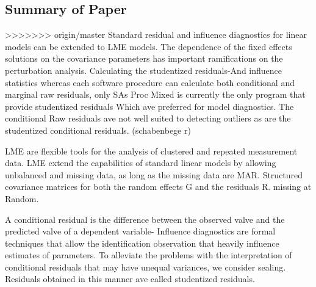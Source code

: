 \documentclass[12pt, a4paper]{article}
\begin{document}
\subsection{Summary of Paper}
>>>>>>> origin/master
Standard residual and influence diagnostics for linear models can be extended to LME models.
The dependence of the fixed effects solutions on the covariance parameters has important ramifications on the perturbation analysis.	
Calculating the studentized residuals-And influence statistics whereas each software procedure can calculate both conditional and marginal raw residuals, only SAs Proc Mixed is currently the only program that provide studentized residuals Which ave preferred for model diagnostics. The conditional Raw residuals ave not well suited to detecting outliers as are the studentized conditional residuals. (schabenbege r)


LME are flexible tools for the analysis of clustered and repeated measurement data. LME extend the capabilities of standard linear models by allowing unbalanced and missing data, as long as the missing data are MAR. Structured covariance matrices for both the random effects G and the residuals R. missing at Random.

A conditional residual is the difference between the observed valve and the predicted valve of a dependent variable- Influence diagnostics are formal techniques that allow the identification observation that heavily influence estimates of parameters.
To alleviate the problems with the interpretation of conditional residuals that may have unequal variances, we consider sealing.
Residuals obtained in this manner ave called studentized residuals.
\end{document}
